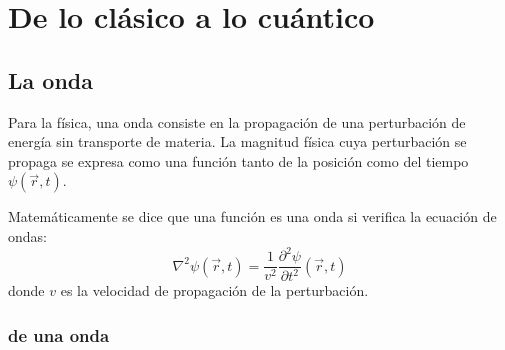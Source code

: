 \chapter{De lo clásico a lo cuántico}\label{ch:de-lo-clásico-a-lo-cuántico}


\section{La onda}\label{sec:la-onda}

Para la física, una onda consiste en la propagación de una perturbación de energía sin transporte de materia.
La magnitud física cuya perturbación se propaga se expresa como una función tanto de la posición como del tiempo
$\psi(\vec{r},t)$.

Matemáticamente se dice que una función es una onda si verifica la ecuación de ondas:
\begin{equation}
    \label{eq:ecuacion-onda}
    \nabla^2\psi(\vec {r},t)=\frac {1}{v^2}\frac{\partial^2\psi}{\partial t^2}(\vec {r},t)
\end{equation}
donde $v$ es la velocidad de propagación de la perturbación.

\subsection{\energialementos de una onda}\label{subsec:elementos-de-una-onda}

